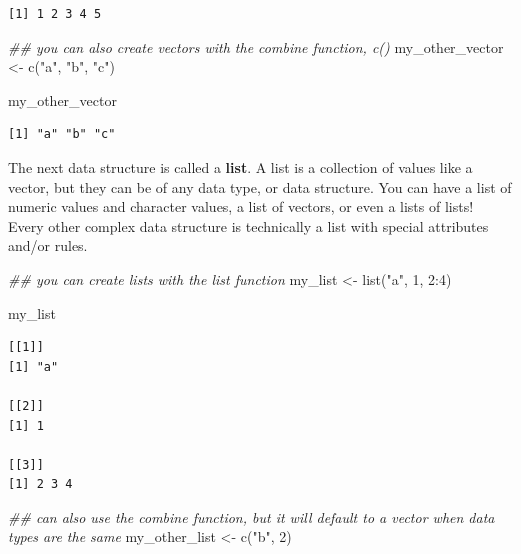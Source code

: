 \documentclass[
  letterpaper,
  DIV=11,
  numbers=noendperiod]{scrreprt}
\newenvironment{Shaded}{\begin{snugshade}}{\end{snugshade}}
\newcommand{\DecValTok}[1]{\textcolor[rgb]{0.68,0.00,0.00}{#1}}
\newcommand{\DocumentationTok}[1]{\textcolor[rgb]{0.37,0.37,0.37}{\textit{#1}}}
\newcommand{\FunctionTok}[1]{\textcolor[rgb]{0.28,0.35,0.67}{#1}}
\newcommand{\NormalTok}[1]{\textcolor[rgb]{0.00,0.23,0.31}{#1}}
\newcommand{\OtherTok}[1]{\textcolor[rgb]{0.00,0.23,0.31}{#1}}
\newcommand{\SpecialCharTok}[1]{\textcolor[rgb]{0.37,0.37,0.37}{#1}}
\newcommand{\StringTok}[1]{\textcolor[rgb]{0.13,0.47,0.30}{#1}}
\begin{document}
\begin{verbatim}
[1] 1 2 3 4 5
\end{verbatim}

\begin{Shaded}
\begin{Highlighting}[]
\DocumentationTok{\#\# you can also create vectors with the combine function, c()}
\NormalTok{my\_other\_vector }\OtherTok{\textless{}{-}} \FunctionTok{c}\NormalTok{(}\StringTok{"a"}\NormalTok{, }\StringTok{"b"}\NormalTok{, }\StringTok{"c"}\NormalTok{)}

\NormalTok{my\_other\_vector}
\end{Highlighting}
\end{Shaded}

\begin{verbatim}
[1] "a" "b" "c"
\end{verbatim}

The next data structure is called a \textbf{list}. A list is a
collection of values like a vector, but they can be of any data type, or
data structure. You can have a list of numeric values and character
values, a list of vectors, or even a lists of lists! Every other complex
data structure is technically a list with special attributes and/or
rules.

\begin{Shaded}
\begin{Highlighting}[]
\DocumentationTok{\#\# you can create lists with the list function}
\NormalTok{my\_list }\OtherTok{\textless{}{-}} \FunctionTok{list}\NormalTok{(}\StringTok{"a"}\NormalTok{, }\DecValTok{1}\NormalTok{, }\DecValTok{2}\SpecialCharTok{:}\DecValTok{4}\NormalTok{)}

\NormalTok{my\_list}
\end{Highlighting}
\end{Shaded}

\begin{verbatim}
[[1]]
[1] "a"

[[2]]
[1] 1

[[3]]
[1] 2 3 4
\end{verbatim}

\begin{Shaded}
\begin{Highlighting}[]
\DocumentationTok{\#\# can also use the combine function, but it will default to a vector when data types are the same}
\NormalTok{my\_other\_list }\OtherTok{\textless{}{-}} \FunctionTok{c}\NormalTok{(}\StringTok{"b"}\NormalTok{, }\DecValTok{2}\NormalTok{)}
\end{Highlighting}
\end{Shaded}
\end{document}
